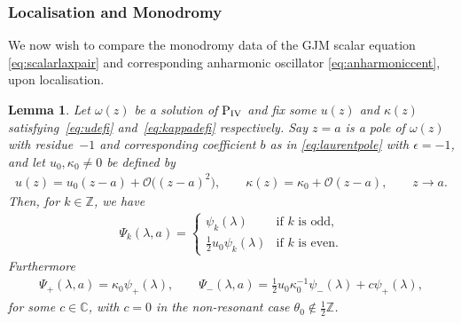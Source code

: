\documentclass[pdftex]{sigma}
\numberwithin{equation}{section}
\newtheorem{lem}[thm]{Lemma}
\newcommand{\om}{\omega}
\begin{document}
\subsubsection{Localisation and Monodromy}
We now wish to compare the monodromy data of the GJM scalar equation \eqref{eq:scalarlaxpair} and corresponding anharmonic oscillator
\eqref{eq:anharmoniccent}, upon localisation.
\begin{lem}\label{lem:ztoalem}
	Let $\om(z)$ be a solution of ${\rm P}_{\rm IV}$ and fix some $u(z)$ and $\kappa(z)$ satisfying~\eqref{eq:udefi} and~\eqref{eq:kappadefi} respectively. Say $z=a$ is a pole of $\om(z)$ with residue~$-1$ and corresponding coefficient
	$b$ as in \eqref{eq:laurentpole} with $\epsilon=-1$, and let $u_0,\kappa_0\neq 0$ be defined by
	\begin{gather}\label{eq:ukappaatpole}
	u(z)=u_0(z-a)+\mathcal{O}\big((z-a)^2\big),\qquad \kappa(z)=\kappa_0+\mathcal{O} (z-a ), \qquad z\rightarrow a.
	\end{gather}
	Then, for $k\in\mathbb{Z}$, we have
	\begin{gather} \label{eq:psiasymp}
	\Psi_k(\lambda,a)=\begin{cases}
	\psi_{k}(\lambda) & \text{if $k$ is odd,}\\
	\tfrac{1}{2}u_0\psi_{k}(\lambda) & \text{if $k$ is even.}
	\end{cases}
	\end{gather}
	Furthermore
	\begin{gather}\label{eq:psi0asymp}
	\Psi_+(\lambda,a)=\kappa_0\psi_+(\lambda),\qquad
	\Psi_-(\lambda,a)=\tfrac{1}{2}u_0\kappa_0^{-1} \psi_-(\lambda)+c\psi_+(\lambda),
	\end{gather}
	for some $c\in\mathbb{C}$, with $c=0$ in the non-resonant case $\theta_0\notin \tfrac{1}{2}\mathbb{Z}$.
\end{lem}
\end{document}
